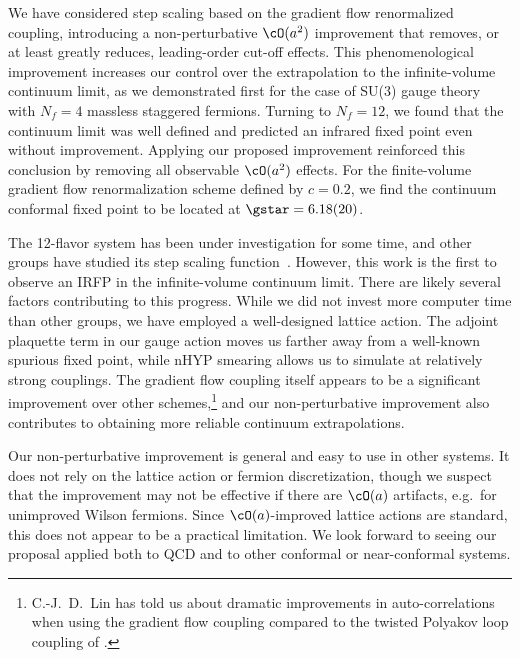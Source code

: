 
We have considered step scaling based on the gradient flow renormalized coupling, introducing a non-perturbative $\cO(a^2)$ improvement that removes, or at least greatly reduces, leading-order cut-off effects.
This phenomenological improvement increases our control over the extrapolation to the infinite-volume continuum limit, as we demonstrated first for the case of SU(3) gauge theory with $N_f = 4$ massless staggered fermions.
Turning to $N_f = 12$, we found that the continuum limit was well defined and predicted an infrared fixed point even without improvement.
Applying our proposed improvement reinforced this conclusion by removing all observable $\cO(a^2)$ effects.
For the finite-volume gradient flow renormalization scheme defined by $c = 0.2$, we find the continuum conformal fixed point to be located at $\gstar = 6.18(20)$.

The 12-flavor system has been under investigation for some time, and other groups have studied its step scaling function~\cite{Lin:2012iw, Appelquist:2007hu, Appelquist:2009ty, Itou:2012qn}.
However, this work is the first to observe an IRFP in the infinite-volume continuum limit.
There are likely several factors contributing to this progress.
While we did not invest more computer time than other groups, we have employed a well-designed lattice action.
The adjoint plaquette term in our gauge action moves us farther away from a well-known spurious fixed point, while nHYP smearing allows us to simulate at relatively strong couplings.
The gradient flow coupling itself appears to be a significant improvement over other schemes,\footnote{C.-J.~D.~Lin has told us about dramatic improvements in auto-correlations when using the gradient flow coupling compared to the twisted Polyakov loop coupling of .} and our non-perturbative improvement also contributes to obtaining more reliable continuum extrapolations.

Our non-perturbative improvement is general and easy to use in other systems.
It does not rely on the lattice action or fermion discretization, though we suspect that the improvement may not be effective if there are $\cO(a)$ artifacts, e.g.\ for unimproved Wilson fermions.
Since $\cO(a)$-improved lattice actions are standard, this does not appear to be a practical limitation.
We look forward to seeing our proposal applied both to QCD and to other conformal or near-conformal systems.
